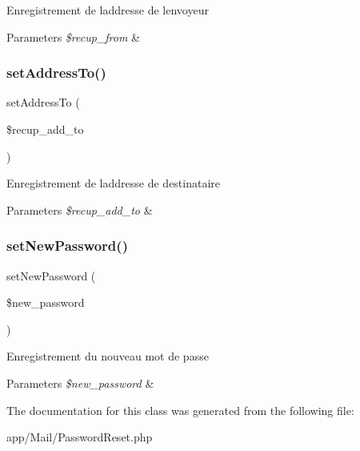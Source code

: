 Enregistrement de l\textquotesingle{}addresse de l\textquotesingle{}envoyeur 
\begin{DoxyParams}{Parameters}
{\em \$recup\+\_\+from} & \\
\hline
\end{DoxyParams}
\mbox{\label{class_app_1_1_mail_1_1_password_reset_a98bb5c2cc536c4ccbe9f34829cfb6375}} 
\subsubsection{\texorpdfstring{set\+Address\+To()}{setAddressTo()}}
{\footnotesize\ttfamily set\+Address\+To (\begin{DoxyParamCaption}\item[{}]{\$recup\+\_\+add\+\_\+to }\end{DoxyParamCaption})}

Enregistrement de l\textquotesingle{}addresse de destinataire 
\begin{DoxyParams}{Parameters}
{\em \$recup\+\_\+add\+\_\+to} & \\
\hline
\end{DoxyParams}
\mbox{\label{class_app_1_1_mail_1_1_password_reset_aef6917e2466e3981d9d2be39a12df733}} 
\subsubsection{\texorpdfstring{set\+New\+Password()}{setNewPassword()}}
{\footnotesize\ttfamily set\+New\+Password (\begin{DoxyParamCaption}\item[{}]{\$new\+\_\+password }\end{DoxyParamCaption})}

Enregistrement du nouveau mot de passe 
\begin{DoxyParams}{Parameters}
{\em \$new\+\_\+password} & \\
\hline
\end{DoxyParams}


The documentation for this class was generated from the following file\+:\begin{DoxyCompactItemize}
\item 
app/\+Mail/Password\+Reset.\+php\end{DoxyCompactItemize}
